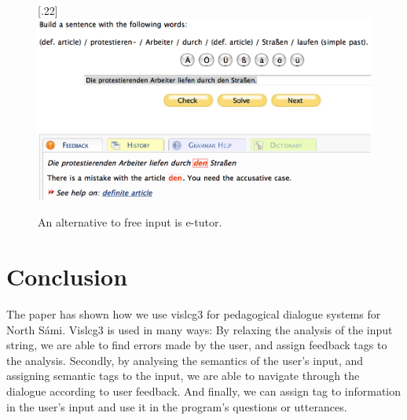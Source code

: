 \documentclass[11pt]{article}
\begin{document}

\begin{figure}[htbp]
\begin{center}
\scalebox{.22}[.22]{\includegraphics{presentation/img/e-tutor-small.png}}\\
\caption{An alternative to free input is e-tutor.}
\label{etutor}
\end{center}
\end{figure}

\section{Conclusion}

The paper has shown how we use vislcg3 for pedagogical dialogue systems for North Sámi. Vislcg3 is used in many ways: By relaxing the analysis of the input string, we are able to find errors made by the user, and assign feedback tags to the analysis. Secondly, by analysing the semantics of the user's input, and assigning semantic tags to the input, we are able to navigate through the dialogue according to user feedback. And finally, we can assign tag to information in the user's input and use it in the program's questions or utterances.  
\end{document}
